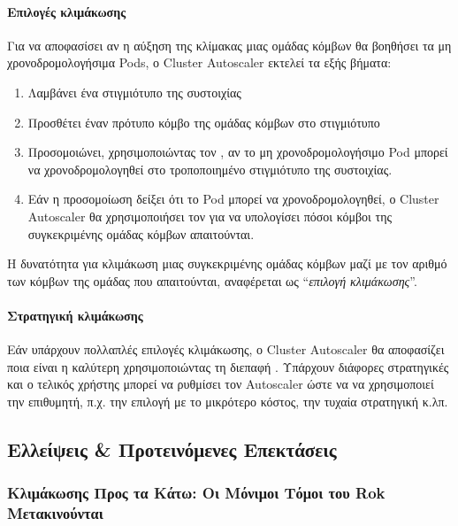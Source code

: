 \paragraph*{Επιλογές κλιμάκωσης}
Για να αποφασίσει αν η αύξηση της κλίμακας μιας ομάδας κόμβων θα βοηθήσει τα μη
χρονοδρομολογήσιμα Pods, ο Cluster Autoscaler εκτελεί τα εξής βήματα:
\begin{enumerate}
      \tightlist
      \item Λαμβάνει ένα στιγμιότυπο της συστοιχίας
      \item Προσθέτει έναν πρότυπο κόμβο της ομάδας κόμβων στο στιγμιότυπο
      \item Προσομοιώνει, χρησιμοποιώντας τον
            , αν το μη χρονοδρομολογήσιμο Pod
            μπορεί να χρονοδρομολογηθεί στο τροποποιημένο στιγμιότυπο της
            συστοιχίας.
      \item Εάν η προσομοίωση δείξει ότι το Pod μπορεί να χρονοδρομολογηθεί, ο
            Cluster Autoscaler θα χρησιμοποιήσει τον
             για να υπολογίσει πόσοι κόμβοι της
            συγκεκριμένης ομάδας κόμβων απαιτούνται.
\end{enumerate}

Η δυνατότητα για κλιμάκωση μιας συγκεκριμένης ομάδας κόμβων μαζί με τον αριθμό
των κόμβων της ομάδας που απαιτούνται, αναφέρεται ως ``\textit{επιλογή
κλιμάκωσης}''.

\paragraph*{Στρατηγική κλιμάκωσης}
Εάν υπάρχουν πολλαπλές επιλογές κλιμάκωσης, ο Cluster Autoscaler θα αποφασίζει
ποια είναι η καλύτερη χρησιμοποιώντας τη διεπαφή . Υπάρχουν
διάφορες στρατηγικές και ο τελικός χρήστης μπορεί να ρυθμίσει τον Autoscaler ώστε να να
χρησιμοποιεί την επιθυμητή, π.χ. την επιλογή με το μικρότερο κόστος, την τυχαία
στρατηγική κ.λπ.


\subsection{Ελλείψεις \& Προτεινόμενες Επεκτάσεις}

\subsubsection{Κλιμάκωσης Προς τα Κάτω: Οι Μόνιμοι Τόμοι του Rok Μετακινούνται}
\label{section-gr:design-autoscaler-unpinned}

